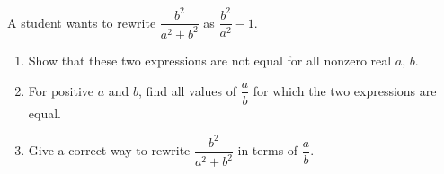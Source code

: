 A student wants to rewrite $\dfrac{b^2}{a^2+b^2}$ as $\dfrac{b^2}{a^2}-1$.
\begin{enumerate}
\item[(a)] Show that these two expressions are not equal for all nonzero real $a$, $b$.
\item[(b)] For positive $a$ and $b$, find all values of $\dfrac {a}{b}$ for which the two expressions are equal.
\item[(c)] Give a correct way to rewrite $\dfrac{b^2}{a^2+b^2}$ in terms of $\dfrac {a}{b}$.
\end{enumerate}
